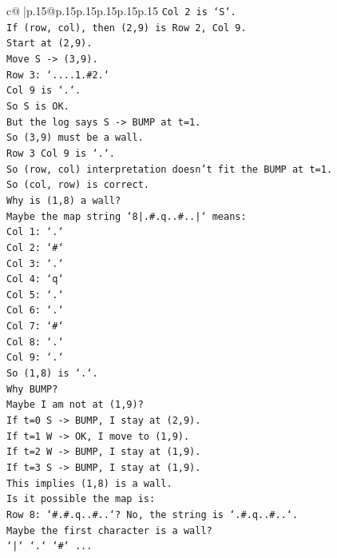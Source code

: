 \documentclass{article}
\begin{document}
{\begin{supertabular}{c@{$\;$}|p{.15\linewidth}@{}p{.15\linewidth}p{.15\linewidth}p{.15\linewidth}p{.15\linewidth}p{.15\linewidth}}
{{{\texttt{Col 2 is `S`.} \\
\texttt{If (row, col), then (2,9) is Row 2, Col 9.} \\
\texttt{Start at (2,9).} \\
\texttt{Move S {-}> (3,9).} \\
\texttt{Row 3: `....1.\#2.`} \\
\texttt{Col 9 is `.`.} \\
\texttt{So S is OK.} \\
\texttt{But the log says S {-}> BUMP at t=1.} \\
\texttt{So (3,9) must be a wall.} \\
\texttt{Row 3 Col 9 is `.`.} \\
\texttt{So (row, col) interpretation doesn't fit the BUMP at t=1.} \\
\texttt{So (col, row) is correct.} \\
\texttt{Why is (1,8) a wall?} \\
\texttt{Maybe the map string `8|.\#.q..\#..|` means:} \\
\texttt{Col 1: `.`} \\
\texttt{Col 2: `\#`} \\
\texttt{Col 3: `.`} \\
\texttt{Col 4: `q`} \\
\texttt{Col 5: `.`} \\
\texttt{Col 6: `.`} \\
\texttt{Col 7: `\#`} \\
\texttt{Col 8: `.`} \\
\texttt{Col 9: `.`} \\
\texttt{So (1,8) is `.`.} \\
\texttt{Why BUMP?} \\
\texttt{Maybe I am not at (1,9)?} \\
\texttt{If t=0 S {-}> BUMP, I stay at (2,9).} \\
\texttt{If t=1 W {-}> OK, I move to (1,9).} \\
\texttt{If t=2 W {-}> BUMP, I stay at (1,9).} \\
\texttt{If t=3 S {-}> BUMP, I stay at (1,9).} \\
\texttt{This implies (1,8) is a wall.} \\
\texttt{Is it possible the map is:} \\
\texttt{Row 8: `\#.\#.q..\#..`? No, the string is `.\#.q..\#..`.} \\
\texttt{Maybe the first character is a wall?} \\
\texttt{`|` `.` `\#` ...} \\
}}}
\end{supertabular}}
\end{document}
